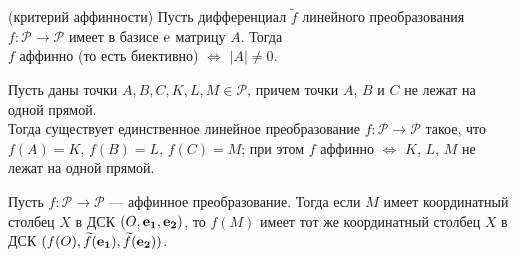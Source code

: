 \begin{predl}\label{p4_2_6}(критерий аффинности)
Пусть 
дифференциал $\widetilde{f}$ линейного преобразования $f: \mathcal{P} \to \mathcal{P}$ 
имеет в базисе $\mathrm{e}$ матрицу $A$. 
Тогда \\ $f$ аффинно (то есть биективно) $\Leftrightarrow$ $|A|\neq 0$.
\end{predl}







\begin{theor}\label{t4_2_2}
Пусть даны точки $A, B, C, K, L, M \in \mathcal{P}$, причем точки $A$, $B$ и $C$ не лежат на одной
прямой.\\
Тогда существует единственное линейное преобразование $f:\mathcal{P} \to \mathcal{P}$ такое, что
$f(A)=K$, $f(B)=L$, $f(C)=M$; при этом $f$ аффинно $\Leftrightarrow$ $K$, $L$, $M$ не лежат на
одной прямой.
\end{theor}



\begin{theor}
Пусть $f:\mathcal{P} \to \mathcal{P}$ --- аффинное преобразование.
Тогда если $M$ имеет координатный столбец
$X$ в ДСК
$(O, \mathbf{e_1}, \mathbf{e_2})$, то
$f(M)$ имеет тот же координатный столбец
$X$
в ДСК
$(f(O), \widetilde{f}(\mathbf{e_1}), \widetilde{f}(\mathbf{e_2}))$.
\end{theor}

